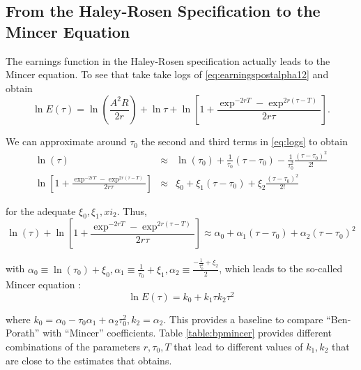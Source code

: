\subsection{From the Haley-Rosen Specification to the Mincer Equation}
The earnings function in the Haley-Rosen specification actually leads to the Mincer equation. To see that take take logs of \eqref{eq:earningspostalpha12} and obtain
\begin{equation}
\ln E(\tau) = \ln \left( \frac{A^2 R}{ 2r} \right) + \ln \tau + \ln \left[ 1 + \frac{\exp^{-2rT} - \exp^{2r(\tau - T)} }{2r \tau} \right]. \label{eq:logs}
\end{equation}

\indent We can approximate around $\tau_{0}$ the second and third terms in \eqref{eq:logs} to obtain
\begin{eqnarray}
\ln(\tau) &\approx& \ln (\tau_{0}) + \frac{1}{\tau_{0}} \left( \tau - \tau_{0} \right) - \frac{1}{\tau_{0}^2} \frac{\left( \tau - \tau_{0} \right)^2}{2!} \nonumber \\
\ln \left[ 1 + \frac{\exp^{-2rT} - \exp^{2r(\tau - T)} }{2r \tau} \right] &\approx& \xi_{0} + \xi_{1} \left( \tau - \tau_{0} \right) + \xi_{2} \frac{\left( \tau - \tau_{0} \right)^2}{2!}
\end{eqnarray}

\noindent for the adequate $\xi_{0}, \xi_{1}, xi_{2}$. Thus,
\begin{equation}
\ln(\tau) + \ln \left[ 1 + \frac{\exp^{-2rT} - \exp^{2r(\tau - T)} }{2r \tau} \right] \approx \alpha_{0} + \alpha_{1}\left( \tau - \tau_{0} \right) + \alpha_{2} \left( \tau - \tau_{0} \right)^2
\end{equation}

\noindent with $\alpha_{0} \equiv \ln(\tau_{0}) + \xi_{0}, \alpha_{1} \equiv \frac{1}{\tau_{0}} + \xi_{1}, \alpha_{2} \equiv \frac{-\frac{1}{\tau_{0}^2} + \xi_{2}}{2}$, which leads to the so-called Mincer equation \citep[see][]{mincer1974schooling}:
\begin{equation}
\ln E(\tau) = k_{0} + k_{1} \tau k_{2} \tau^2 \label{eq:mincer}
\end{equation}

\noindent where $k_{0} = \alpha_{0} - \tau_{0} \alpha_{1} + \alpha_{2} \tau_{0}^2, k_{2} = \alpha_{2}$. This provides a baseline to compare ``Ben-Porath'' with ``Mincer'' coefficients. Table \ref{table:bpmincer} provides different combinations of the parameters $r, \tau_{0}, T$ that lead to different values of $k_{1}, k_{2}$ that are close to the estimates that \citet{mincer1974schooling} obtains.

